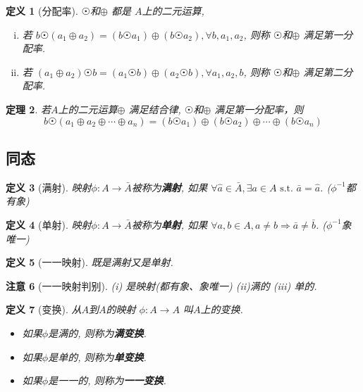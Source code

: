 \documentclass[UTF8]{ctexart}
\newtheorem{Definition}{定义}%
\newtheorem{Theorem}[Definition]{定理}
\newtheorem{Remark}[Definition]{注意}
\begin{document}
\begin{Definition}[分配率]
$ \astrosun $和$ \oplus $ 都是 $A$上的二元运算, 
\begin{enumerate}[i)]
\item 若
$ b \astrosun (a_1 \oplus a_2) = (b \astrosun a_1) \oplus (b \astrosun a_2), \forall b, a_1, a_2 $, 则称 $ \astrosun$和$ \oplus $  满足第一分配率.
\item 若
$ (a_1 \oplus a_2) \astrosun b = (a_1 \astrosun b) \oplus ( a_2 \astrosun b), \forall a_1, a_2, b $, 则称 $ \astrosun$和$\oplus $  满足第二分配率.
\end{enumerate}
\end{Definition}


\begin{Theorem}
若$A$上的二元运算$\oplus$ 满足结合律, $ \astrosun $和$\oplus $ 满足第一分配率，则
$$
b \astrosun ( a_1 \oplus a_2 \oplus \cdots \oplus a_n ) =  ( b \astrosun a_1) \oplus (b \astrosun a_2) \oplus \cdots \oplus (b \astrosun a_n)
$$
\end{Theorem}

\subsection{同态}

\begin{Definition}[满射]
映射$\phi: A \rightarrow \bar{A}$被称为\textbf{满射}, 如果
$\forall \hat{a} \in \bar{A}, \exists a \in A \text{ s.t. } \bar{a} = \hat{a}$. 
($\phi^{-1}$都有象)
\end{Definition}

\begin{Definition}[单射]
映射$\phi: A \rightarrow \bar{A}$被称为\textbf{单射}, 如果
$\forall a, b \in A, a \neq b \Rightarrow \bar{a} \neq \bar{b}$.
 ($\phi^{-1}$象唯一)
\end{Definition}

\begin{Definition}[一一映射]
既是满射又是单射.
\end{Definition}

\begin{Remark}[一一映射判别]
(i) 是映射(都有象、象唯一) (ii)满的 (iii) 单的.
\end{Remark}

\begin{Definition}[变换]
从$A$到$A$的映射 $\phi: A \rightarrow A$ 叫$A$上的变换.
\begin{itemize}
	\item 如果$\phi$是满的, 则称为\textbf{满变换}.
	\item 如果$\phi$是单的, 则称为\textbf{单变换}.
	\item 如果$\phi$是一一的, 则称为\textbf{一一变换}.
\end{itemize}
\end{Definition}
\end{document}
